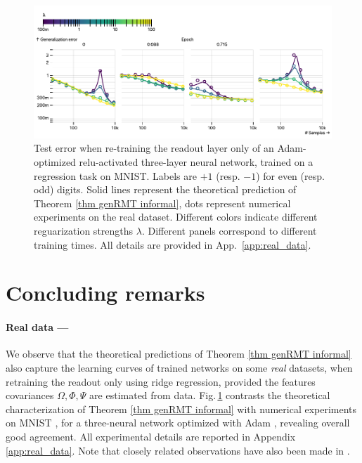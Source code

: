 \begin{figure}
    \centering
    \includegraphics[scale=0.6]{chapters/deeprf/figs/real_emp_660.pdf}
    \caption{Test error when re-training the readout layer only of an Adam-optimized relu-activated three-layer neural network, trained on a regression task on MNIST. Labels are $+1$ (resp. $-1$) for even (resp. odd) digits. Solid lines represent the theoretical prediction of Theorem \ref{thm genRMT informal}, dots represent numerical experiments on the real dataset. Different colors indicate different reguarization strengths $\lambda$. Different panels correspond to different training times. All details are provided in App.~\ref{app:real_data}.}
    \label{fig:real_MNIST}
\end{figure}

\section{Concluding remarks}
\paragraph{Real data ---}We observe that the theoretical predictions of Theorem \ref{thm genRMT informal} also capture the learning curves of trained networks on some \textit{real} datasets, when retraining the readout only using ridge regression, provided the features covariances $\Omega,\Phi,\Psi$ are estimated from data. Fig.\,\ref{fig:real_MNIST} contrasts the theoretical characterization of Theorem \ref{thm genRMT informal} with numerical experiments on MNIST \cite{lecun1998gradient}, for a three-neural network optimized with Adam \cite{kingma2014adam}, revealing overall good agreement. All experimental details are reported in Appendix \ref{app:real_data}. Note that closely related observations have also been made in \cite{Loureiro2021CapturingTL}.

